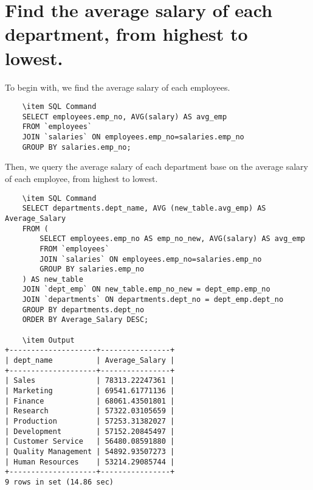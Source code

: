 \documentclass[13pt,a4paper]{report}
\begin{document}
\section{ Find the average salary of each department, from highest to lowest. }
\begin{itemize}
To begin with, we find the average salary of each employees.
\begin{lstlisting}
	\item SQL Command
	SELECT employees.emp_no, AVG(salary) AS avg_emp 
	FROM `employees` 
	JOIN `salaries` ON employees.emp_no=salaries.emp_no 
	GROUP BY salaries.emp_no;
\end{lstlisting}
Then, we query the average salary of each department base on the average salary of each employee, from highest to lowest.
\begin{lstlisting}
	\item SQL Command
	SELECT departments.dept_name, AVG (new_table.avg_emp) AS Average_Salary 
	FROM (
		SELECT employees.emp_no AS emp_no_new, AVG(salary) AS avg_emp 
		FROM `employees` 
		JOIN `salaries` ON employees.emp_no=salaries.emp_no 
		GROUP BY salaries.emp_no
	) AS new_table 
	JOIN `dept_emp` ON new_table.emp_no_new = dept_emp.emp_no 
	JOIN `departments` ON departments.dept_no = dept_emp.dept_no 
	GROUP BY departments.dept_no 
	ORDER BY Average_Salary DESC;

	\item Output
+--------------------+----------------+
| dept_name          | Average_Salary |
+--------------------+----------------+
| Sales              | 78313.22247361 |
| Marketing          | 69541.61771136 |
| Finance            | 68061.43501801 |
| Research           | 57322.03105659 |
| Production         | 57253.31382027 |
| Development        | 57152.20845497 |
| Customer Service   | 56480.08591880 |
| Quality Management | 54892.93507273 |
| Human Resources    | 53214.29085744 |
+--------------------+----------------+
9 rows in set (14.86 sec)


\end{lstlisting}
\end{itemize}
\end{document}
